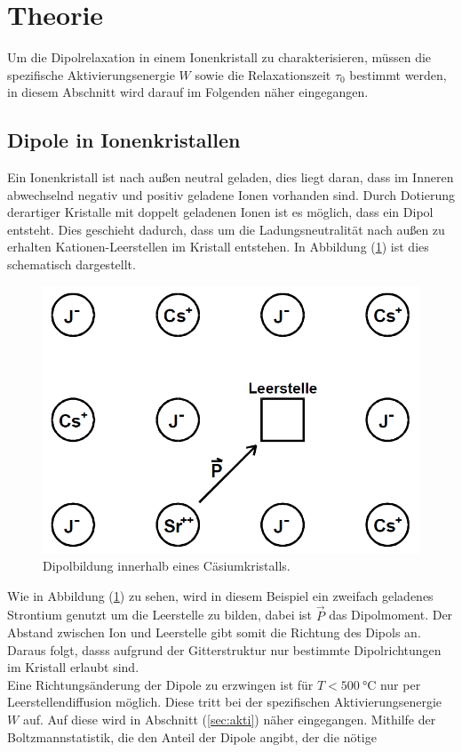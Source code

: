 \section{Theorie}
\label{sec:Theorie}
Um die Dipolrelaxation in einem Ionenkristall zu charakterisieren, müssen die spezifische Aktivierungsenergie $W$ sowie die Relaxationszeit $\tau_\mathrm{0}$ bestimmt werden, in diesem Abschnitt wird darauf im Folgenden näher
eingegangen.
\subsection{Dipole in Ionenkristallen}
\label{sec:11}
Ein Ionenkristall ist nach außen neutral geladen, dies liegt daran, dass im Inneren abwechselnd negativ und positiv geladene Ionen vorhanden sind. Durch Dotierung derartiger Kristalle mit doppelt geladenen Ionen ist es möglich, dass ein
Dipol entsteht. Dies geschieht dadurch, dass um die Ladungsneutralität nach außen zu erhalten Kationen-Leerstellen im Kristall entstehen. In Abbildung (\ref{fig:doti}) ist dies schematisch dargestellt.
\begin{figure}[h!]
  \centering
  \includegraphics[scale=0.5]{fig/Dipol.png}
  \caption{Dipolbildung innerhalb eines Cäsiumkristalls.}
  \label{fig:doti}
\end{figure}
Wie in Abbildung (\ref{fig:doti}) zu sehen, wird in diesem Beispiel ein zweifach geladenes Strontium genutzt um die Leerstelle zu bilden, dabei ist $\vec{P}$ das Dipolmoment. Der Abstand zwischen Ion und Leerstelle gibt somit
die Richtung des Dipols an. Daraus folgt, dasss aufgrund der Gitterstruktur nur bestimmte Dipolrichtungen im Kristall erlaubt sind. \\ Eine Richtungsänderung der Dipole zu erzwingen ist für $T<\SI{500}{\degreeCelsius}$ nur per Leerstellendiffusion möglich. Diese tritt bei der spezifischen Aktivierungsenergie $W$ auf. Auf diese wird in Abschnitt (\ref{sec:akti}) näher eingegangen. Mithilfe der Boltzmannstatistik, die den Anteil der Dipole angibt, der die nötige
